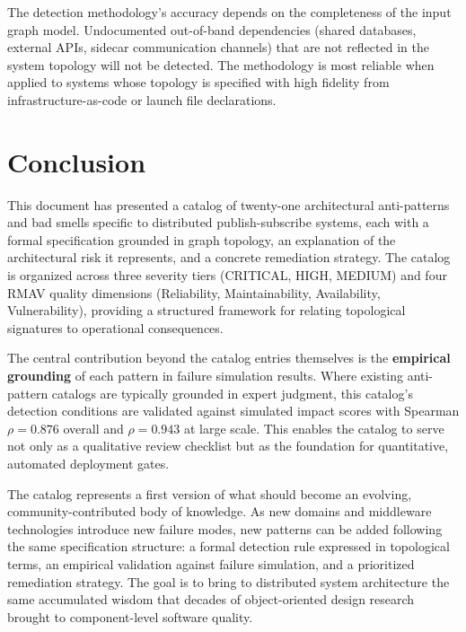 \documentclass[11pt]{article}
\begin{document}
The detection methodology's accuracy depends on the completeness of the input graph model. Undocumented out-of-band dependencies (shared databases, external APIs, sidecar communication channels) that are not reflected in the system topology will not be detected. The methodology is most reliable when applied to systems whose topology is specified with high fidelity from infrastructure-as-code or launch file declarations.

\section{Conclusion}

This document has presented a catalog of twenty-one architectural anti-patterns and bad smells specific to distributed publish-subscribe systems, each with a formal specification grounded in graph topology, an explanation of the architectural risk it represents, and a concrete remediation strategy. The catalog is organized across three severity tiers (CRITICAL, HIGH, MEDIUM) and four RMAV quality dimensions (Reliability, Maintainability, Availability, Vulnerability), providing a structured framework for relating topological signatures to operational consequences.

The central contribution beyond the catalog entries themselves is the \textbf{empirical grounding} of each pattern in failure simulation results. Where existing anti-pattern catalogs are typically grounded in expert judgment, this catalog's detection conditions are validated against simulated impact scores with Spearman $\rho = 0.876$ overall and $\rho = 0.943$ at large scale. This enables the catalog to serve not only as a qualitative review checklist but as the foundation for quantitative, automated deployment gates.

The catalog represents a first version of what should become an evolving, community-contributed body of knowledge. As new domains and middleware technologies introduce new failure modes, new patterns can be added following the same specification structure: a formal detection rule expressed in topological terms, an empirical validation against failure simulation, and a prioritized remediation strategy. The goal is to bring to distributed system architecture the same accumulated wisdom that decades of object-oriented design research brought to component-level software quality.
\end{document}
